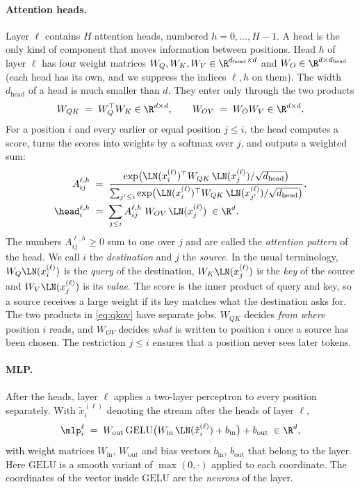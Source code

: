\paragraph{Attention heads.} Layer $\ell$ contains $H$ attention heads, numbered $h=0,\dots,H-1$. A head is the
only kind of component that moves information between positions. Head $h$ of layer $\ell$ has four weight matrices
$W_Q,W_K,W_V\in\R^{d_{\mathrm{head}}\times d}$ and $W_O\in\R^{d\times d_{\mathrm{head}}}$ (each head has its own,
and we suppress the indices $\ell,h$ on them). The width $d_{\mathrm{head}}$ of a head is much smaller than
$d$. They enter only through the two products
\begin{equation}\label{eq:qkov}
W_{QK} \;=\; W_Q^\top W_K\in\R^{d\times d},\qquad W_{OV} \;=\; W_O W_V\in\R^{d\times d}.
\end{equation}
For a position $i$ and every earlier or equal position $j\le i$, the head computes a score, turns the scores into
weights by a softmax over $j$, and outputs a weighted sum:
\begin{align}
A^{\ell,h}_{ij} &\;=\; \frac{\exp\!\big(\LN(x_i^{(\ell)})^\top W_{QK}\,\LN(x_j^{(\ell)})/\sqrt{d_{\mathrm{head}}}\big)}
{\sum_{j'\le i}\exp\!\big(\LN(x_i^{(\ell)})^\top W_{QK}\,\LN(x_{j'}^{(\ell)})/\sqrt{d_{\mathrm{head}}}\big)},
\label{eq:pattern}\\
\head_i^{\ell,h} &\;=\; \sum_{j\le i}A^{\ell,h}_{ij}\;W_{OV}\,\LN(x_j^{(\ell)}) \;\in\R^d. \label{eq:headout}
\end{align}
The numbers $A^{\ell,h}_{ij}\ge 0$ sum to one over $j$ and are called the \emph{attention pattern} of the head.
We call $i$ the \emph{destination} and $j$ the \emph{source}. In the usual terminology,
$W_Q\LN(x_i^{(\ell)})$ is the \emph{query} of the destination, $W_K\LN(x_j^{(\ell)})$ is the \emph{key} of the source
and $W_V\LN(x_j^{(\ell)})$ is its \emph{value}. The score is the inner product of query and key, so a source
receives a large weight if its key matches what the destination asks for. The two products in \eqref{eq:qkov} have separate
jobs. $W_{QK}$ decides \emph{from where} position $i$ reads, and $W_{OV}$ decides \emph{what} is written to
position $i$ once a source has been chosen. The restriction $j\le i$ ensures that a position never sees later
tokens.

\paragraph{MLP.} After the heads, layer $\ell$ applies a two-layer perceptron to every position separately. With
$\tilde x_i^{(\ell)}$ denoting the stream after the heads of layer $\ell$,
\begin{equation}\label{eq:mlp}
\mlp_i^{\ell} \;=\; W_{\mathrm{out}}\,\mathrm{GELU}\big(W_{\mathrm{in}}\,\LN(\tilde x_i^{(\ell)})+b_{\mathrm{in}}\big)+b_{\mathrm{out}} \;\in\R^d,
\end{equation}
with weight matrices $W_{\mathrm{in}}$, $W_{\mathrm{out}}$ and bias vectors $b_{\mathrm{in}}$, $b_{\mathrm{out}}$ that
belong to the layer. Here $\mathrm{GELU}$ is a smooth variant of $\max(0,\cdot)$ applied to each coordinate. The coordinates of the
vector inside $\mathrm{GELU}$ are the \emph{neurons} of the layer.

